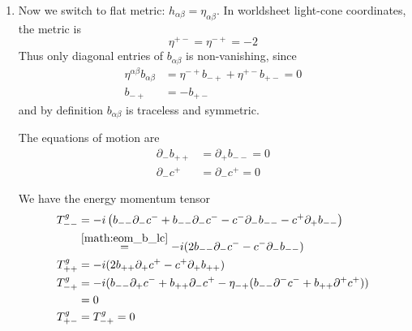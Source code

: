 \begin{enumerate}[label=(\alph*)]
	\item Now we switch to flat metric: $h_{\alpha\beta} = \eta_{\alpha\beta}$. In worldsheet light-cone coordinates, the metric is
		\begin{equation*}
			\eta^{+-} = \eta^{-+} = -2
		\end{equation*}
		Thus only diagonal entries of $b_{\alpha\beta}$ is non-vanishing, since
		\begin{align*}
			\eta^{\alpha \beta} b_{\alpha\beta} &= \eta^{-+} b_{-+} + \eta^{+-} b_{+-} = 0\\
			b_{-+} &= - b_{+-}
		\end{align*}
		and by definition $b_{\alpha\beta}$ is traceless and symmetric.

		The equations of motion are
		\begin{align}
			\partial_- b_{++} &= \partial_+ b_{--} = 0 \label{math:eom_b_lc}\\
			\partial_- c^+ &= \partial_- c^+ = 0 \label{math:eom_c_lc}
		\end{align}

		We have the energy momentum tensor
		\begin{align}
			T_{--}^g &= -i \left( b_{--} \partial_- c^- + b_{--}\partial_- c^- - c^- \partial_- b_{--} - c^+ \partial_+ b_{--} \right)	 \notag \\
						&\stackrel{\eqref{math:eom_b_lc}}{=} -i (2 b_{--} \partial_- c^- - c^- \partial_- b_{--}) \\
			T_{++}^g &= -i (2b_{++} \partial_+ c^+ - c^+ \partial_+ b_{++}) \\
			T_{-+}^g &= -i (b_{--}\partial_+ c^- + b_{++} \partial_{-} c^+ - \eta_{-+} (b_{--}\partial^- c^- + b_{++}\partial^+ c^+)) \notag \\
						&= 0 \\
			T_{+-}^g	&=  T_{-+}^g = 0
		\end{align}


\end{enumerate}

